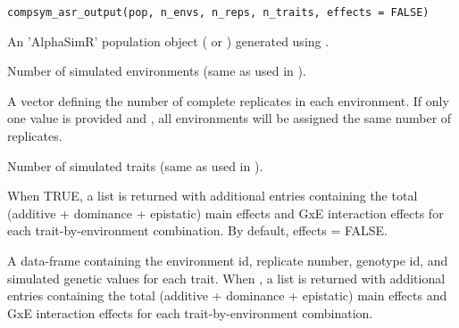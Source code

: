 \documentclass[a4paper]{book}
\begin{document}
%
\begin{Usage}
\begin{verbatim}
compsym_asr_output(pop, n_envs, n_reps, n_traits, effects = FALSE)
\end{verbatim}
\end{Usage}
%
\begin{Arguments}
\begin{ldescription}
\item[\code{pop}] An 'AlphaSimR' population object ( or
) generated using .

\item[\code{n\_envs}] Number of simulated environments (same as used in
).

\item[\code{n\_reps}] A vector defining the number of complete replicates in each environment. If only
one value is provided and , all environments will be assigned the same
number of replicates.

\item[\code{n\_traits}] Number of simulated traits (same as used in ).

\item[\code{effects}] When TRUE, a list is returned with additional entries containing the total
(additive + dominance + epistatic) main effects and GxE interaction effects for each
trait-by-environment combination. By default, effects = FALSE.
\end{ldescription}
\end{Arguments}
%
\begin{Value}
A data-frame containing the environment id, replicate number, genotype id, and
simulated genetic values for each trait. When , a list is returned with
additional entries containing the total (additive + dominance + epistatic) main effects and
GxE interaction effects for each trait-by-environment combination.
\end{Value}
%
\end{document}
